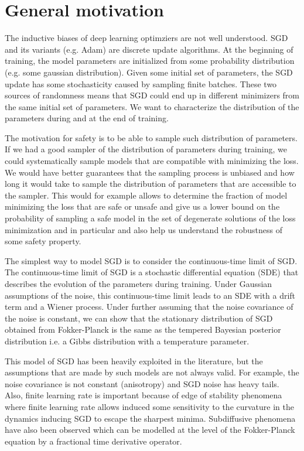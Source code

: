 \documentclass[11pt]{article}
\begin{document}
\section{General motivation}

The inductive biases of deep learning optimziers are not well understood. SGD and its variants (e.g. Adam) are discrete update algorithms. At the beginning of training, the model parameters are initialized from some probability distribution (e.g. some gaussian distribution). Given some initial set of parameters, the SGD update has some stochasticity caused by sampling finite batches. These two sources of randomness means that SGD could end up in different minimizers from the same initial set of parameters. We want to characterize the distribution of the parameters during and at the end of training. 

The motivation for safety is to be able to sample such distribution of parameters. If we had a good sampler of the distribution of parameters during training, we could systematically sample models that are compatible with minimizing the loss. We would have better guarantees that the sampling process is unbiased and how long it would take to sample the distribution of parameters that are accessible to the sampler. This would for example allows to determine the fraction of model minimizing the loss that are safe or unsafe and give us a lower bound on the probability of sampling a safe model in the set of degenerate solutions of the loss minimization and in particular and also help us understand the robustness of some safety property.

The simplest way to model SGD is to consider the continuous-time limit of SGD. The continuous-time limit of SGD is a stochastic differential equation (SDE) that describes the evolution of the parameters during training. Under Gaussian assumptions of the noise, this continuous-time limit leads to an SDE with a drift term and a Wiener process. Under further assuming that the noise covariance of the noise is constant, we can show that the stationary distribution of SGD obtained from Fokker-Planck is the same as the tempered Bayesian posterior distribution i.e. a Gibbs distribution with a temperature parameter.

This model of SGD has been heavily exploited in the literature, but the assumptions that are made by such models are not always valid. For example, the noise covariance is not constant (anisotropy) and SGD noise has heavy tails. Also, finite learning rate is important because of edge of stability phenomena where finite learning rate allows induced some sensitivity to the curvature in the dynamics inducing SGD to escape the sharpest minima. Subdiffusive phenomena have also been observed which can be modelled at the level of the Fokker-Planck equation by a fractional time derivative operator. 
\end{document}
